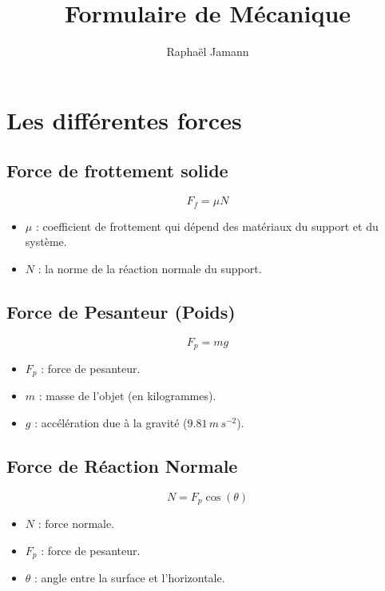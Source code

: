 \documentclass[a4paper,12pt]{article}
\title{Formulaire de Mécanique}
\author{Raphaël Jamann}
\date{}
\begin{document}
    \maketitle

    \section{Les différentes forces}

    \begin{multicols}{2}
        
        \subsection{Force de frottement solide}
            $$ F_f = \mu N $$ 
            \begin{itemize}[label=$\bullet$]
                \item $\mu$ : coefficient de frottement qui dépend des matériaux du support et du système.
                \item $N$ : la norme de la réaction normale du support.
            \end{itemize}
        \subsection{Force de Pesanteur (Poids)}
            $$ F_p = m g $$
            \begin{itemize}[label=$\bullet$]
                \item $F_p$ : force de pesanteur.
                \item $m$ : masse de l'objet (en kilogrammes).
                \item $g$ : accélération due à la gravité ($9.81 \, m \, s^{-2}$).
            \end{itemize}
            
        \subsection{Force de Réaction Normale}
                $$ N = F_p \cos(\theta) $$
            \begin{itemize}[label=$\bullet$]
                \item $N$ : force normale.
                \item $F_p$ : force de pesanteur.
                \item $\theta$ : angle entre la surface et l'horizontale.
            \end{itemize}
            

\end{multicols}
\end{document}
